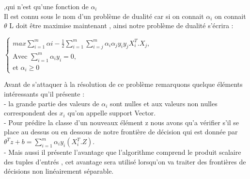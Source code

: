   ,qui n'est qu'une fonction de ${\alpha}_{i}$ \\
Il est connu sous le nom d'un problème de dualité car si on connait ${\alpha}_{i}$ on connait ${\theta}$  
L doit être maximise maintenant , ainsi notre problème de dualité s'écrira :\\
\begin{center}
	$ \left\{\begin{array}{ll}
	max \sum _{i=1}^{m} {\alpha}{i} -  \frac{1}{2} \sum _{i=1}^{m} \sum _{i=j}^{m} {\alpha}_{i}{\alpha}_{j}{y}_{i}{y}_{j} {X}_{i}^{T} . {{X}_{j}},&  \\
	\mbox{Avec } \sum _{i=1}^{m}{\alpha}_{i}{y}_{i}=0 , & \\
	\mbox{et }{\alpha}_{i} \ge 0 
	\end{array}\right.$
\end{center}
Avant de s'attaquer à la résolution de ce problème remarquons quelque éléments intéressants qu'il présente :\\
-  la grande partie des valeurs de ${\alpha}_{i}$ sont nulles et  aux    valeurs non nulles correspondent des ${x}_{i}$ qu'on appelle support Vector.\\
-  Pour prédire la classe d'un  nouveaux élément z nous avons qu'a vérifier s'il se place au dessus ou en dessous de notre frontière de décision qui est donnée par ${\theta }^{T}{z} + b =  \sum _{i=1}^{m}{\alpha}_{i}{y}_{i}({X}^{T}_{i}.Z) $. \\
- Mais aussi il présente l'avantage que l'algorithme comprend le produit scalaire des tuples d'entrés , cet avantage sera utilisé lorsqu'on va traiter des frontières de  décisions non linéairement séparable.
